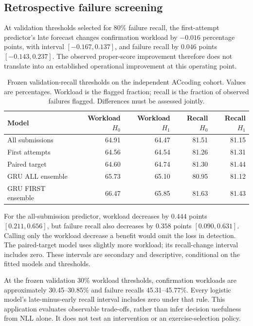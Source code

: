 \documentclass[11pt]{article}
\newcommand{\1}{\mathbb{I}}
\begin{document}
\subsection{Retrospective failure screening}
At validation thresholds selected for 80\% failure recall, the first-attempt predictor's late forecast changes confirmation workload by $-0.016$ percentage points, with interval $[-0.167,0.137]$, and failure recall by $0.046$ points $[-0.143,0.237]$. The observed proper-score improvement therefore does not translate into an established operational improvement at this operating point.

\begin{table}[htbp]
\centering
\caption{Frozen validation-recall thresholds on the independent ACcoding cohort. Values are percentages. Workload is the flagged fraction; recall is the fraction of observed failures flagged. Differences must be assessed jointly.}
\label{tab:screening}
\begin{tabular}{lrrrr}
\toprule
Model & Workload $H_0$ & Workload $H_1$ & Recall $H_0$ & Recall $H_1$ \\
\midrule
All submissions & 64.91 & 64.47 & 81.51 & 81.15 \\
First attempts & 64.56 & 64.54 & 81.26 & 81.31 \\
Paired target & 64.60 & 64.74 & 81.30 & 81.44 \\
GRU ALL ensemble & 65.73 & 65.10 & 80.95 & 81.12 \\
GRU FIRST ensemble & 66.47 & 65.85 & 81.63 & 81.43 \\
\bottomrule
\end{tabular}
\end{table}

For the all-submission predictor, workload decreases by $0.444$ points $[0.211,0.656]$, but failure recall also decreases by $0.358$ points $[0.090,0.631]$. Calling only the workload decrease a benefit would omit the loss in detection. The paired-target model uses slightly more workload; its recall-change interval includes zero. These intervals are secondary and descriptive, conditional on the fitted models and thresholds.

At the frozen validation 30\% workload thresholds, confirmation workloads are approximately 30.45--30.85\% and failure recalls 45.31--45.77\%. Every logistic model's late-minus-early recall interval includes zero under that rule. This application evaluates observable trade-offs, rather than infer decision usefulness from NLL alone. It does not test an intervention or an exercise-selection policy.
\end{document}
